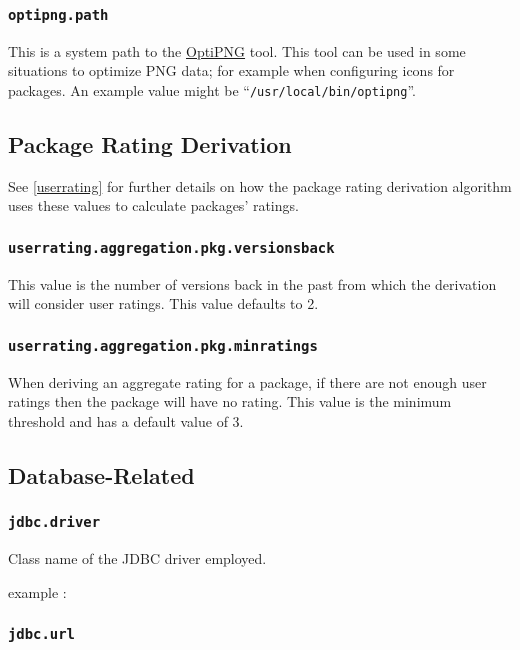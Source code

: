 \subsubsection{\tt optipng.path}

This is a system path to the \href{http://optipng.sourceforge.net/}{OptiPNG} tool.  This tool can be used in some situations to optimize PNG data; for example when configuring icons for packages.  An example value might be ``{\tt /usr/local/bin/optipng}''.

\subsection{Package Rating Derivation}

See \ref{userrating} for further details on how the package rating derivation algorithm uses these values to calculate packages' ratings.

\subsubsection{\tt userrating.aggregation.pkg.versionsback}

This value is the number of versions back in the past from which the derivation will consider user ratings.  This value defaults to 2.

\subsubsection{\tt userrating.aggregation.pkg.minratings}

When deriving an aggregate rating for a package, if there are not enough user ratings then the package will have no rating.  This value is the minimum threshold and has a default value of 3.

\subsection{Database-Related}

\subsubsection{\tt jdbc.driver}

Class name of the JDBC driver employed.

example : 

\subsubsection{\tt jdbc.url}

